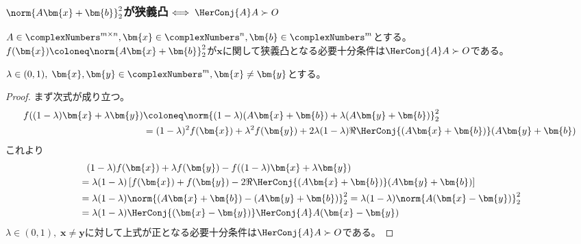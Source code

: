             \subsubsection{\texorpdfstring{$\norm{A\bm{x}+\bm{b}}_2^2$}{||Ax+b||\string^2}が狭義凸\texorpdfstring{$\iff \HerConj{A}A\succ O$}{⇔ A*Aが正定}}
                \begin{shadebox}
                    $A \in \complexNumbers^{m\times n}, \bm{x} \in \complexNumbers^n, \bm{b} \in \complexNumbers^m$とする。
                    $f(\bm{x}) \coloneq \norm{A\bm{x}+\bm{b}}_2^2$が$\bm{x}$に関して狭義凸となる必要十分条件は$\HerConj{A}A\succ O$である。
                \end{shadebox}
                $\lambda \in (0,1),\; \bm{x},\bm{y} \in \complexNumbers^m, \bm{x}\neq\bm{y}$とする。
                \begin{proof}
                    まず次式が成り立つ。
                    \begin{align*}
                        f((1-\lambda)\bm{x} + \lambda\bm{y}) &\coloneq \norm{(1-\lambda)(A\bm{x}+\bm{b}) + \lambda(A\bm{y}+\bm{b})}_2^2 \\
                        &= (1-\lambda)^2 f(\bm{x}) + \lambda^2 f(\bm{y}) + 2\lambda(1-\lambda)\Re{\HerConj{(A\bm{x}+\bm{b})}(A\bm{y}+\bm{b})}
                    \end{align*}
                    これより
                    \begin{align*}
                        &\phantom{=} (1-\lambda)f(\bm{x}) + \lambda f(\bm{y}) - f((1-\lambda)\bm{x} + \lambda\bm{y}) \\
                        &= \lambda(1-\lambda)\left[f(\bm{x}) + f(\bm{y}) - 2\Re{\HerConj{(A\bm{x}+\bm{b})}(A\bm{y}+\bm{b})}\right] \\
                        &= \lambda(1-\lambda)\norm{(A\bm{x}+\bm{b}) - (A\bm{y}+\bm{b})}_2^2 = \lambda(1-\lambda)\norm{A(\bm{x}-\bm{y})}_2^2 \\
                        &= \lambda(1-\lambda)\HerConj{(\bm{x}-\bm{y})}\HerConj{A}A(\bm{x}-\bm{y})
                    \end{align*}
                    $\lambda \in (0,1),\;\bm{x}\neq\bm{y}$に対して上式が正となる必要十分条件は$\HerConj{A}A\succ O$である。
                \end{proof}
